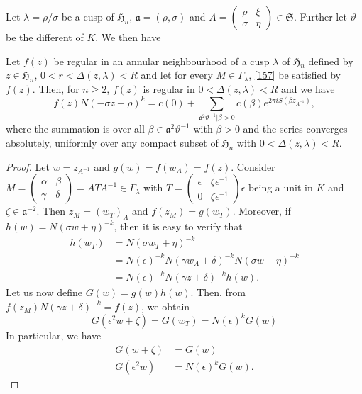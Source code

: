 Let $\lambda=\rho/\sigma$ be a cusp of $\mathfrak{H}_{n}$,
$\mathfrak{a}=(\rho,\sigma)$ and $A=\left(\begin{smallmatrix} \rho &
  \xi\\ \sigma & \eta\end{smallmatrix}\right)\in
  \mathfrak{S}$. Further let $\vartheta$ be the different of $K$. We
  then have

\begin{thm}\label{thm17}
Let $f(z)$ be regular in an annular neighbourhood of a cusp $\lambda$
of $\mathfrak{H}_{n}$ defined by $z\in \mathfrak{H}_{n}$,
$0<r<\Delta(z,\lambda)<R$ and let for every $M\in \Gamma_{\lambda}$,
\eqref{157} be satisfied by $f(z)$. Then, for $n\geq 2$, $f(z)$ is
regular in $0<\Delta(z,\lambda)<R$ and we have
$$
f(z)N(-\sigma
z+\rho)^{k}=c(0)+\sum_{\mathfrak{a}^{2}\vartheta^{-1}|\beta>0}c(\beta)e^{2\pi
  iS(\beta z_{A^{-1}})}, 
$$
where the summation is over all
$\beta\in\mathfrak{a}^{2}\vartheta^{-1}$ with $\beta>0$ and the series
converges absolutely, uniformly over any compact subset of
$\mathfrak{H}_{n}$ with $0<\Delta(z,\lambda)<R$.
\end{thm}

\begin{proof}
Let $w=z_{A^{-1}}$ and $g(w)=f(w_{A})=f(z)$. Consider
$M=\left(\begin{smallmatrix} \alpha & \beta\\ \gamma & \delta
\end{smallmatrix}\right)=ATA^{-1}\in\Gamma_{\lambda}$ with
$T=\left(\begin{smallmatrix} \epsilon & \zeta\epsilon^{-1}\\ 0 &
  \zeta\epsilon^{-1}\end{smallmatrix}\right)\epsilon$ being a unit in
$K$ and $\zeta\in \mathfrak{a}^{-2}$. Then $z_{M}=(w_{T})_{A}$ and
$f(z_{M})=g(w_{T})$. Moreover, if $h(w)=N(\sigma w+\eta)^{-k}$, then
it is easy to verify that
\begin{align*}
h(w_{T}) &= N(\sigma w_{T}+\eta)^{-k}\\
&= N(\epsilon)^{-k}N(\gamma w_{A}+\delta)^{-k}N(\sigma w+\eta)^{-k}\\
&= N(\epsilon)^{-k}N(\gamma z+\delta)^{-k}h(w).
\end{align*}
Let us now define $G(w)=g(w)h(w)$. Then, from $f(z_{M})N(\gamma
z+\delta)^{-k}=f(z)$, we obtain
$$
G(\epsilon^{2}w+\zeta)=G(w_{T})=N(\epsilon)^{k}G(w)
$$
In particular, we have
\begin{equation*}
\begin{aligned}
G(w+\zeta) &= G(w)\\
G(\epsilon^{2}w) &= N(\epsilon)^{k}G(w).
\end{aligned}\tag{158}\label{158}
\end{equation*}\pageoriginale
\end{proof}

